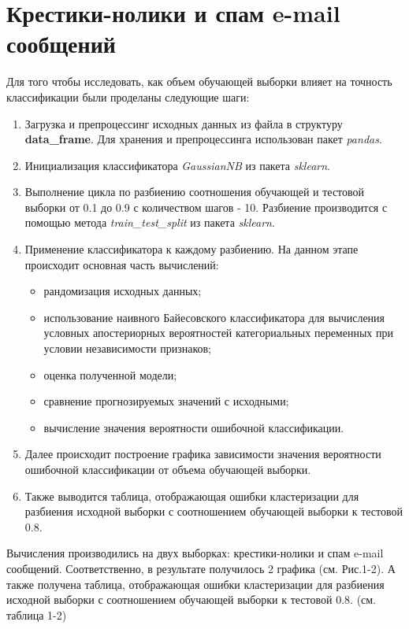 \documentclass[]{article}
\numberwithin{equation}{section}
\begin{document}
    \newpage
    \section{Крестики-нолики и спам e-mail сообщений}
        Для того чтобы исследовать, как объем обучающей выборки влияет на точность классификации были проделаны следующие шаги:

        \begin{enumerate}
            \item Загрузка и препроцессинг исходных данных из файла в структуру \textbf{data\_frame}. Для хранения и препроцессинга использован пакет \textit{pandas}.
            \item Инициализация классификатора \textit{GaussianNB} из пакета \textit{sklearn}.
            \item Выполнение цикла по разбиению соотношения обучающей и тестовой выборки от 0.1 до 0.9 с количеством шагов - 10. Разбиение производится с помощью метода \textit{train\_test\_split} из пакета \textit{sklearn}.
            \item Применение классификатора к каждому разбиению. На данном этапе происходит основная часть вычислений:
                \begin{itemize}
                    \item рандомизация исходных данных;
                    \item использование наивного Байесовского классификатора для вычисления условных апостериорных вероятностей категориальных переменных при условии независимости признаков;
                    \item оценка полученной модели;
                    \item сравнение прогнозируемых значений с исходными;
                    \item вычисление значения вероятности ошибочной классификации.
                \end{itemize}
            \item Далее происходит построение графика зависимости значения вероятности ошибочной классификации от объема обучающей выборки.
            \item Также выводится таблица, отображающая ошибки кластеризации для разбиения исходной выборки с соотношением обучающей выборки к тестовой 0.8.
        \end{enumerate}

        Вычисления производились на двух выборках: крестики-нолики и спам e-mail сообщений. Соответственно, в результате получилось 2 графика (см. Рис.1-2). А также получена таблица, отображающая ошибки кластеризации для разбиения исходной выборки с соотношением обучающей выборки к тестовой 0.8. (см. таблица 1-2)
\end{document}
